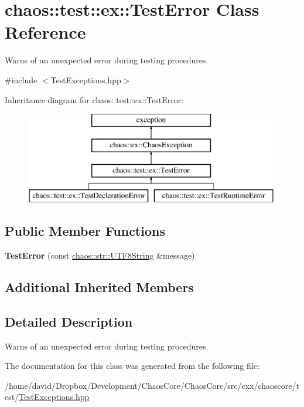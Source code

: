\hypertarget{classchaos_1_1test_1_1ex_1_1_test_error}{\section{chaos\-:\-:test\-:\-:ex\-:\-:Test\-Error Class Reference}
\label{classchaos_1_1test_1_1ex_1_1_test_error}
}


Warns of an unexpected error during testing procedures.  




{\ttfamily \#include $<$Test\-Exceptions.\-hpp$>$}

Inheritance diagram for chaos\-:\-:test\-:\-:ex\-:\-:Test\-Error\-:\begin{figure}[H]
\begin{center}
\leavevmode
\includegraphics[height=4.000000cm]{classchaos_1_1test_1_1ex_1_1_test_error}
\end{center}
\end{figure}
\subsection*{Public Member Functions}
\begin{DoxyCompactItemize}
\item 
\hypertarget{classchaos_1_1test_1_1ex_1_1_test_error_aaea7852b129fc8ed6f6eb182a7d347ad}{{\bfseries Test\-Error} (const \hyperlink{classchaos_1_1str_1_1_u_t_f8_string}{chaos\-::str\-::\-U\-T\-F8\-String} \&message)}\label{classchaos_1_1test_1_1ex_1_1_test_error_aaea7852b129fc8ed6f6eb182a7d347ad}

\end{DoxyCompactItemize}
\subsection*{Additional Inherited Members}


\subsection{Detailed Description}
Warns of an unexpected error during testing procedures. 

The documentation for this class was generated from the following file\-:\begin{DoxyCompactItemize}
\item 
/home/david/\-Dropbox/\-Development/\-Chaos\-Core/\-Chaos\-Core/src/cxx/chaoscore/test/\hyperlink{_test_exceptions_8hpp}{Test\-Exceptions.\-hpp}\end{DoxyCompactItemize}
